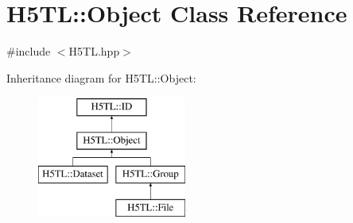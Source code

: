 \hypertarget{class_h5_t_l_1_1_object}{\section{H5\-T\-L\-:\-:Object Class Reference}
\label{class_h5_t_l_1_1_object}
}


{\ttfamily \#include $<$H5\-T\-L.\-hpp$>$}

Inheritance diagram for H5\-T\-L\-:\-:Object\-:\begin{figure}[H]
\begin{center}
\leavevmode
\includegraphics[height=4.000000cm]{class_h5_t_l_1_1_object}
\end{center}
\end{figure}
